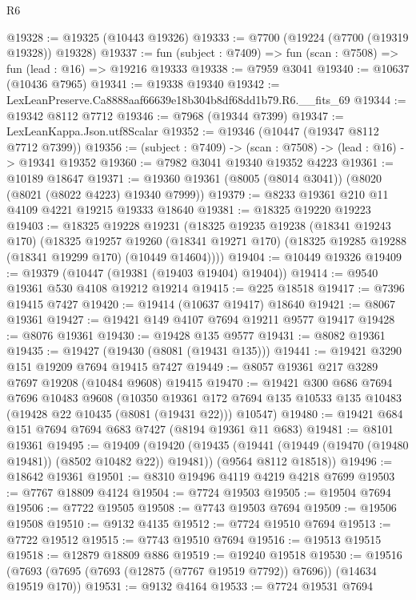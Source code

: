 \begin{lexlean}{R6}
\begin{coremodule}
@19328 := @19325 (@10443 @19326)
@19333 := @7700 (@19224 (@7700 (@19319 @19328)) @19328)
@19337 := fun (subject : @7409) => fun (scan : @7508) => fun (lead : @16) => @19216 @19333
@19338 := @7959 @3041
@19340 := @10637 (@10436 @7965)
@19341 := @19338 @19340
@19342 := LexLeanPreserve.Ca8888aaf66639e18b304b8df68dd1b79.R6.__fits_69
@19344 := @19342 @8112 @7712
@19346 := @7968 (@19344 @7399)
@19347 := LexLeanKappa.Json.utf8Scalar
@19352 := @19346 (@10447 (@19347 @8112 @7712 @7399))
@19356 := (subject : @7409) -> (scan : @7508) -> (lead : @16) -> @19341 @19352
@19360 := @7982 @3041 @19340 @19352 @4223
@19361 := @10189 @18647
@19371 := @19360 @19361 (@8005 (@8014 @3041)) (@8020 (@8021 (@8022 @4223) @19340 @7999))
@19379 := @8233 @19361 @210 @11 @4109 @4221 @19215 @19333 @18640
@19381 := @18325 @19220 @19223
@19403 := @18325
    @19228
    @19231
    (@18325
      @19235
      @19238
      (@18341 @19243 @170)
      (@18325
        @19257
        @19260
        (@18341 @19271 @170)
        (@18325 @19285 @19288 (@18341 @19299 @170) (@10449 @14604))))
@19404 := @10449 @19326
@19409 := @19379 (@10447 (@19381 (@19403 @19404) @19404))
@19414 := @9540 @19361 @530 @4108 @19212 @19214
@19415 := @225 @18518
@19417 := @7396 @19415 @7427
@19420 := @19414 (@10637 @19417) @18640
@19421 := @8067 @19361
@19427 := @19421 @149 @4107 @7694 @19211 @9577 @19417
@19428 := @8076 @19361
@19430 := @19428 @135 @9577
@19431 := @8082 @19361
@19435 := @19427 (@19430 (@8081 (@19431 @135)))
@19441 := @19421 @3290 @151 @19209 @7694 @19415 @7427
@19449 := @8057 @19361 @217 @3289 @7697 @19208 (@10484 @9608) @19415
@19470 := @19421
    @300
    @686
    @7694
    @7696
    @10483
    @9608
    (@10350
      @19361
      @172
      @7694
      @135
      @10533
      @135
      @10483
      (@19428 @22 @10435 (@8081 (@19431 @22)))
      @10547)
@19480 := @19421 @684 @151 @7694 @7694 @683 @7427 (@8194 @19361 @11 @683)
@19481 := @8101 @19361
@19495 := @19409
    (@19420
      (@19435 (@19441 (@19449 (@19470 (@19480 @19481)) (@8502 @10482 @22)) @19481))
      (@9564 @8112 @18518))
@19496 := @18642 @19361
@19501 := @8310 @19496 @4119 @4219 @4218 @7699
@19503 := @7767 @18809 @4124
@19504 := @7724 @19503
@19505 := @19504 @7694
@19506 := @7722 @19505
@19508 := @7743 @19503 @7694
@19509 := @19506 @19508
@19510 := @9132 @4135
@19512 := @7724 @19510 @7694
@19513 := @7722 @19512
@19515 := @7743 @19510 @7694
@19516 := @19513 @19515
@19518 := @12879 @18809 @886
@19519 := @19240 @19518
@19530 := @19516 (@7693 (@7695 (@7693 (@12875 (@7767 @19519 @7792)) @7696)) (@14634 @19519 @170))
@19531 := @9132 @4164
@19533 := @7724 @19531 @7694

\end{coremodule}
\end{lexlean}
